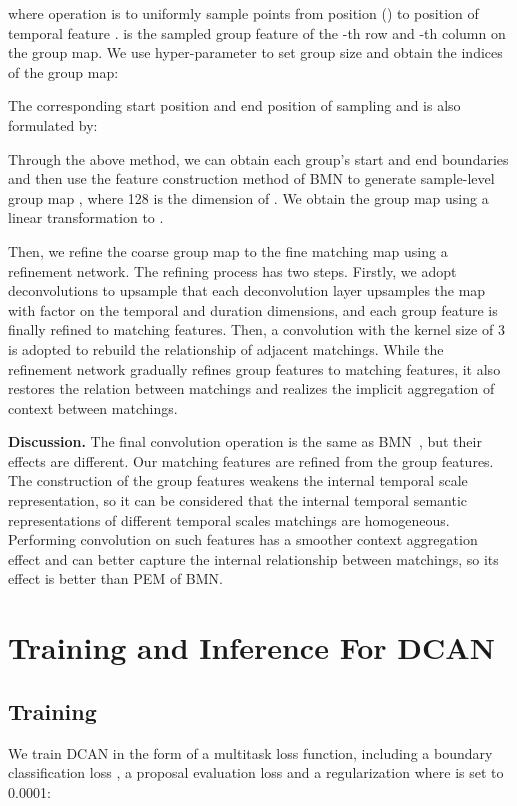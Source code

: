 \documentclass[letterpaper]{article} \usepackage{aaai22}  \usepackage{times}  \usepackage{helvet}  \usepackage{courier}  \usepackage[hyphens]{url}  \usepackage{graphicx} \urlstyle{rm} \def\UrlFont{\rm}  \usepackage{natbib}  \usepackage{caption} \DeclareCaptionStyle{ruled}{labelfont=normalfont,labelsep=colon,strut=off} \frenchspacing  \setlength{\pdfpagewidth}{8.5in}  \setlength{\pdfpageheight}{11in}  \usepackage{algorithm}
\begin{document}
where  operation is to uniformly sample  points from position  () to position  of temporal feature .  is the sampled group feature of the -th row and -th column on the group map. We use hyper-parameter  to set group size and obtain the indices of the group map:

The corresponding start position  and end position  of sampling and is also formulated by:


Through the above method, we can obtain each group's start and end boundaries and then use the feature construction method of BMN to generate sample-level group map , where 128 is the dimension of . We obtain the group map  using a linear transformation to .

Then, we refine the coarse group map  to the fine matching map  using a refinement network.
The refining process has two steps.
Firstly, we adopt deconvolutions to upsample  that each deconvolution layer upsamples the map with factor  on the temporal and duration dimensions, and each group feature is finally refined to  matching features.
Then, a convolution with the kernel size of 3 is adopted to rebuild the relationship of adjacent matchings.
While the refinement network gradually refines group features to matching features, it also restores the relation between matchings and realizes the implicit aggregation of context between matchings.


\noindent\textbf{Discussion.}
The final convolution operation is the same as BMN~\cite{bmn}, but their effects are different.
Our matching features are refined from the group features. 
The construction of the group features weakens the internal temporal scale representation, so it can be considered that the internal temporal semantic representations of different temporal scales matchings are homogeneous.
Performing convolution on such features has a smoother context aggregation effect and can better capture the internal relationship between matchings, so its effect is better than PEM of BMN.





\section{Training and Inference For DCAN}

\subsection{Training}
We train DCAN in the form of a multitask loss function, including a boundary classification loss  , a proposal evaluation loss  and a regularization where  is set to 0.0001:
\end{document}
